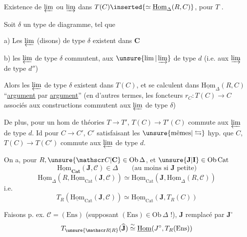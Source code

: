 Existence de $\varprojlim$ ou $\varinjlim$ dans $T(C)\inserted{\simeq\underline{\mathrm{Hom}}_{\Delta}(R,C)}$, pour $T$ .

Soit $\delta$ un type de diagramme, tel que

a) Les $\varprojlim$ (disons) de type $\delta$ existent dans $\mathbf C$

b) les $\varprojlim$ de type $\delta$ commutent,   aux $\unsure{\lim|\varinjlim}$ de type $d$ (i.e. aux $\varinjlim$ de type $d''$)

Alors les $\varprojlim$ de type $\delta$ existent dans $T(C)$, et se calculent dans $\underline{\mathrm{Hom}}_{\Delta}(R,C)$ ``\uline{argument} par \uline{argument}'' (en d'autres termes, les foncteurs $r_{C}:T(C)\longrightarrow C$ associés aux constructions commutent aux $\varprojlim$ de type $\delta$)

De plus, pour un hom de théories  $T\longrightarrow T'$, $T(C)\longrightarrow T'(C)$ commute aux $\varprojlim$ de type $d$. Id pour $C\longrightarrow C'$, $C'$ satisfaisant les $\unsure{\text{mêmes}|\leftrightarrows}$ hyp. que $C$, $T(C)\longrightarrow T(C')$ commute aux $\varprojlim$ de type $d$.

On a, pour $R,\unsure{\mathscr C|\mathbf C}\in\mathrm{Ob}\,\Delta$,  et $\unsure{\mathbf J|\mathbf I}\in\mathrm{Ob}\,\mathrm{Cat}$
\[
\underline{\mathrm{Hom}}_{\mathbf{Cat}}(\mathbf J,\mathscr C)\in\Delta
\qquad\text{(au moins si $\mathbf J$ petite)}
\]
\[
\underline{\mathrm{Hom}}_{\Delta}(R,\underline{\mathrm{Hom}}_{\mathrm{Cat}}(\mathbf J,\mathscr C))
\simeq\underline{\mathrm{Hom}}_{\mathrm{Cat}}(\mathbf J,\underline{\mathrm{Hom}}_{\Delta}(R,\mathscr C))
\]
i.e.
\[
\boxed{T_R(\underline{\mathrm{Hom}}_{\mathrm{Cat}}(\mathbf J,\mathscr C))\simeq
\underline{\mathrm{Hom}}_{\mathrm{Cat}}(\mathbf J,T_R(C))}
\]

Faisons p. ex. $\mathscr C=(\mathrm{Ens})$ (supposant $(\mathrm{Ens})\in\mathrm{Ob}\,\Delta$ !), $\mathbf J$ remplacé par $\mathbf J^{\circ}$
\[
T_{\unsure{\mathscr R|R}}(\widehat{\mathbf J})\overset{\sim}{\simeq}\underline{\mathrm{Hom}}(J^{\circ},T_R(\mathrm{Ens}))
\]

